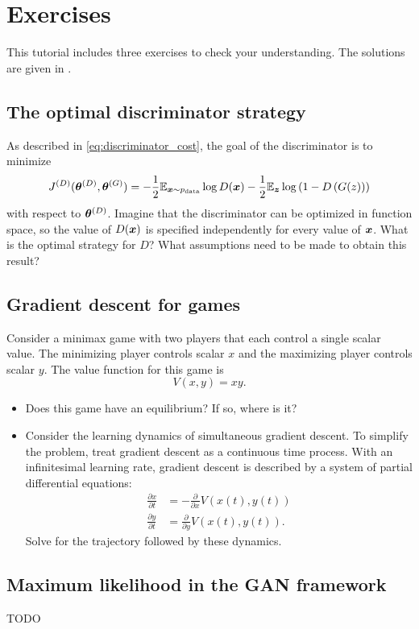 \section{Exercises}

This tutorial includes three exercises to check your understanding.
The solutions are given in .

\subsection{The optimal discriminator strategy}
\label{sec:opt_d}

As described in \eqref{eq:discriminator_cost}, the goal of the discriminator is to minimize
\begin{equation}
  J^{(D)}({\bm{\theta}}^{(D)}, {\bm{\theta}}^{(G)}) = -\frac{1}{2} \mathbb{E}_{{\bm{x}} \sim p_{\rm{data}}} \log D({\bm{x}}) - \frac{1}{2} \mathbb{E}_{{\bm{z}}} \log \left(1 - D\left( G(z) \right) \right)
\end{equation}
with respect to ${\bm{\theta}}^{(D)}$.
Imagine that the discriminator can be optimized in function space, so the value of
$D({\bm{x}})$ is specified independently for every value of ${\bm{x}}$.
What is the optimal strategy for $D$?
What assumptions need to be made to obtain this result?

\subsection{Gradient descent for games}
\label{sec:xy_exercise}

Consider a minimax game with two players that each control a single scalar value.
The minimizing player controls scalar $x$ and the maximizing player controls
scalar $y$.
The value function for this game is
\[ V(x, y) = x y .\]

\begin{itemize}
  \item Does this game have an equilibrium? If so, where is it?
  \item Consider the learning dynamics of simultaneous gradient descent.
        To simplify the problem, treat gradient descent as a continuous time
        process.
        With an infinitesimal learning rate, gradient descent is described by a system of partial differential equations:
        \begin{align}
          \frac{\partial x}{\partial t} &= - \frac{\partial}{\partial x} V\left( x(t), y(t) \right) \\
          \frac{\partial y}{\partial t} &= \frac{\partial}{\partial y} V\left( x(t), y(t) \right).
        \end{align}
        Solve for the trajectory followed by these dynamics.
\end{itemize}



\subsection{Maximum likelihood in the GAN framework}
\label{sec:mle_exercise}
TODO
